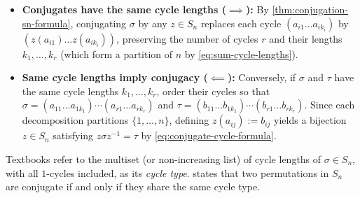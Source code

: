 \begin{content}


\begin{steps}
\begin{itemize}
    \item \textbf{Conjugates have the same cycle lengths ($\implies$):} By \cref{thm:conjugation-sn-formula}, conjugating $\sigma$ by any $z \in S_n$ replaces each cycle $(a_{i1} \dots a_{i k_i})$ by $(z(a_{i1}) \dots z(a_{i k_i}))$, preserving the number of cycles $r$ and their lengths $k_1, \dots, k_r$ (which form a partition of $n$ by \eqref{eq:sum-cycle-lengths}).
    \item \textbf{Same cycle lengths imply conjugacy ($\impliedby$):} Conversely, if $\sigma$ and $\tau$ have the same cycle lengths $k_1, \dots, k_r$, order their cycles so that $\sigma = (a_{11} \dots a_{1 k_1}) \cdots (a_{r1} \dots a_{r k_r})$ and $\tau = (b_{11} \dots b_{1 k_1}) \cdots (b_{r1} \dots b_{r k_r})$. Since each decomposition partitions $\{1, \dots, n\}$, defining $z(a_{ij}) := b_{ij}$ yields a bijection $z \in S_n$ satisfying $z \sigma z^{-1} = \tau$ by \eqref{eq:conjugate-cycle-formula}.
\end{itemize}
\end{steps}
\end{content}

\begin{aiNote}
Textbooks refer to the multiset (or non-increasing list) of cycle lengths of $\sigma \in S_n$, with all $1$-cycles included, as its \emph{cycle type}.  states that two permutations in $S_n$ are conjugate if and only if they share the same cycle type.
\end{aiNote}

